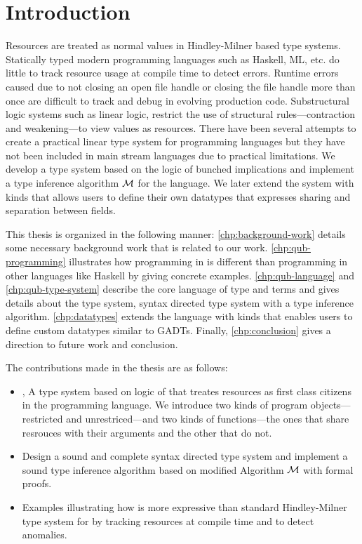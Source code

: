 \chapter{Introduction}\label{chp:intro}

Resources are treated as normal values in Hindley-Milner based type systems. Statically typed modern programming languages such as
Haskell, ML, etc. do little to track resource usage at compile time to detect errors. Runtime errors caused due to not closing an open file handle
or closing the file handle more than once are difficult to track and debug in evolving production code.
Substructural logic systems such as linear logic, restrict the use of structural rules---contraction and weakening---to view values as resources.
There have been several attempts to create a practical linear type system for programming languages but they have not been
included in main stream languages due to practical limitations. We develop a type system based on the logic of bunched implications
and implement a type inference algorithm $\mathcal{M}$ for the language. We later extend the system with kinds that allows users to define
their own datatypes that expresses sharing and separation between fields.

This thesis is organized in the following manner: \cref{chp:background-work} details some necessary background work that is related to our work.
\cref{chp:qub-programming} illustrates how programming in \qub{} is different than programming in other languages like Haskell by giving concrete examples.
\cref{chp:qub-language} and \cref{chp:qub-type-system} describe the core language of type and terms and gives details about the type system,
syntax directed type system with a type inference algorithm. \cref{chp:datatypes} extends the language with kinds that enables users to define
custom datatypes similar to GADTs. Finally, \cref{chp:conclusion} gives a direction to future work and conclusion.

The contributions made in the thesis are as follows:
\begin{itemize}
\item \qub{}, A type system based on logic of \BI{} that treates resources as first class citizens in the programming language.
  We introduce two kinds of program objects---restricted and unrestriced---and two kinds of functions---the ones that share resrouces with
  their arguments and the other that do not.
\item Design a sound and complete syntax directed type system and implement a sound type inference algorithm based on modified Algorithm $\mathcal{M}$ with
  formal proofs.
\item Examples illustrating how \qub{} is more expressive than standard Hindley-Milner type system for by tracking resources at compile time and to detect anomalies.
\end{itemize}